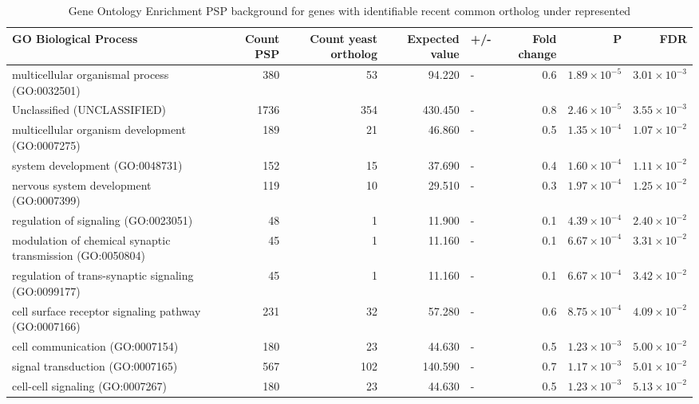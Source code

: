 \begin{sidewaystable}[ht]
\centering
\begin{adjustbox}{width=1\textwidth}
\small
\begin{tabular}{lrrrlrrr}

GO Biological Process & Count PSP & Count yeast ortholog & Expected value & +/- & Fold change & P & FDR \\ 
  \hline
multicellular organismal process (GO:0032501) & 380 & 53 & 94.220 & - & 0.6 & $1.89 \times 10^{-5}$ & $3.01 \times 10^{-3}$ \\ 
  Unclassified (UNCLASSIFIED) & 1736 & 354 & 430.450 & - & 0.8 & $2.46 \times 10^{-5}$ & $3.55 \times 10^{-3}$ \\ 
  multicellular organism development (GO:0007275) & 189 & 21 & 46.860 & - & 0.5 & $1.35 \times 10^{-4}$ & $1.07 \times 10^{-2}$ \\ 
  system development (GO:0048731) & 152 & 15 & 37.690 & - & 0.4 & $1.60 \times 10^{-4}$ & $1.11 \times 10^{-2}$ \\ 
  nervous system development (GO:0007399) & 119 & 10 & 29.510 & - & 0.3 & $1.97 \times 10^{-4}$ & $1.25 \times 10^{-2}$ \\ 
  regulation of signaling (GO:0023051) & 48 & 1 & 11.900 & - & 0.1 & $4.39 \times 10^{-4}$ & $2.40 \times 10^{-2}$ \\ 
  modulation of chemical synaptic transmission (GO:0050804) & 45 & 1 & 11.160 & - & 0.1 & $6.67 \times 10^{-4}$ & $3.31 \times 10^{-2}$ \\ 
  regulation of trans-synaptic signaling (GO:0099177) & 45 & 1 & 11.160 & - & 0.1 & $6.67 \times 10^{-4}$ & $3.42 \times 10^{-2}$ \\ 
  cell surface receptor signaling pathway (GO:0007166) & 231 & 32 & 57.280 & - & 0.6 & $8.75 \times 10^{-4}$ & $4.09 \times 10^{-2}$ \\ 
  cell communication (GO:0007154) & 180 & 23 & 44.630 & - & 0.5 & $1.23 \times 10^{-3}$ & $5.00 \times 10^{-2}$ \\ 
  signal transduction (GO:0007165) & 567 & 102 & 140.590 & - & 0.7 & $1.17 \times 10^{-3}$ & $5.01 \times 10^{-2}$ \\ 
  cell-cell signaling (GO:0007267) & 180 & 23 & 44.630 & - & 0.5 & $1.23 \times 10^{-3}$ & $5.13 \times 10^{-2}$ \\ 
   \hline
\end{tabular}
\end{adjustbox}
\caption{Gene Ontology Enrichment PSP background for genes with identifiable recent common ortholog under represented} 
\end{sidewaystable}
